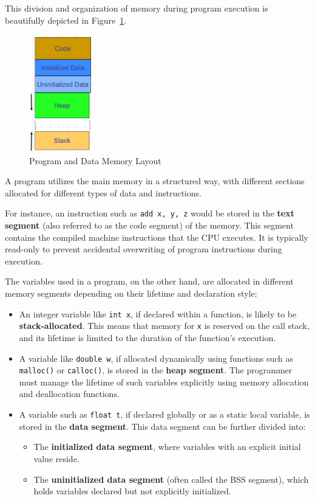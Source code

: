 \documentclass[12pt]{book}
\begin{document}
This division and organization of memory during program execution is beautifully depicted in Figure~\ref{fig:program_data}.

\begin{figure}[H]
    \centering
    \includegraphics[width=0.25\textwidth]{images/program_data.png}
    \caption{Program and Data Memory Layout}
    \label{fig:program_data}
\end{figure}
A program utilizes the main memory in a structured way, with different sections allocated for different types of data and instructions. 

For instance, an instruction such as \texttt{add x, y, z} would be stored in the \textbf{text segment} (also referred to as the code segment) of the memory. This segment contains the compiled machine instructions that the CPU executes. It is typically read-only to prevent accidental overwriting of program instructions during execution.

The variables used in a program, on the other hand, are allocated in different memory segments depending on their lifetime and declaration style:

\begin{itemize}
    \item An integer variable like \texttt{int x}, if declared within a function, is likely to be \textbf{stack-allocated}. This means that memory for \texttt{x} is reserved on the call stack, and its lifetime is limited to the duration of the function's execution.
    
    \item A variable like \texttt{double w}, if allocated dynamically using functions such as \texttt{malloc()} or \texttt{calloc()}, is stored in the \textbf{heap segment}. The programmer must manage the lifetime of such variables explicitly using memory allocation and deallocation functions.
    
    \item A variable such as \texttt{float t}, if declared globally or as a static local variable, is stored in the \textbf{data segment}. This data segment can be further divided into:
    \begin{itemize}
        \item The \textbf{initialized data segment}, where variables with an explicit initial value reside.
        \item The \textbf{uninitialized data segment} (often called the BSS segment), which holds variables declared but not explicitly initialized.
    \end{itemize}
\end{itemize}
\end{document}
